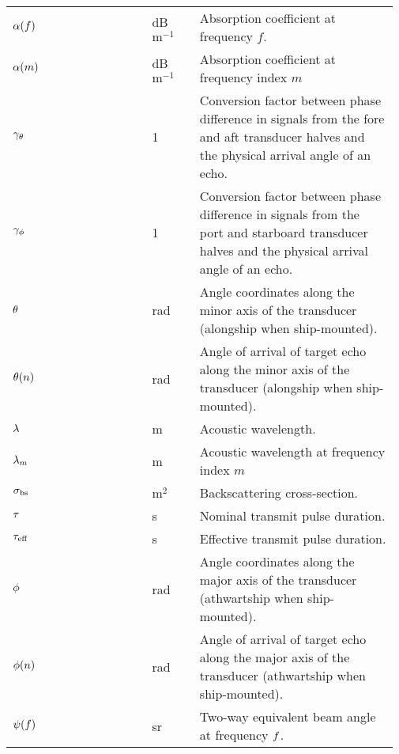\documentclass[12pt,a4paper]{article}
\begin{document}
\begin{longtable}{p{0.15\linewidth} p{0.20\linewidth} p{0.12\linewidth} p{0.5\linewidth} }
$\alpha(f)$  & & dB $\textrm{m}^{-1}$ & Absorption coefficient at frequency $f$.\\
$\alpha(m)$ & & dB $\textrm{m}^{-1}$ & Absorption coefficient at frequency index $m$\\
$\gamma_\theta$ & & 1 & Conversion factor between phase difference in signals from the fore and aft transducer halves and the physical arrival angle of an echo.\\
$\gamma_\phi$ & & 1 & Conversion factor between phase difference in signals from the port and starboard transducer halves and the physical arrival angle of an echo.\\
$\theta$ & & rad & Angle coordinates along the minor axis of the transducer (alongship when ship-mounted).\\
$\theta(n)$ & & rad & Angle of arrival of target echo along the minor axis of the transducer (alongship when ship-mounted).\\
$\lambda$ & & m &  Acoustic wavelength.\\
$\lambda_m$ & & m & Acoustic wavelength at frequency index $m$\\
$\sigma_{\textrm{bs}}$ & & $\textrm{m}^2$ & Backscattering cross-section.\\
$\tau$ & & s & Nominal transmit pulse duration.\\
$\tau_{\textrm{eff}}$ & & s & Effective transmit pulse duration.\\
$\phi$ & & rad & Angle coordinates along the major axis of the transducer (athwartship when ship-mounted).\\
$\phi(n)$ & & rad & Angle of arrival of target echo along the major axis of the transducer (athwartship when ship-mounted).\\
$\psi(f)$ & & sr & Two-way equivalent beam angle at frequency $f$.\\
\end{longtable}
\end{document}
